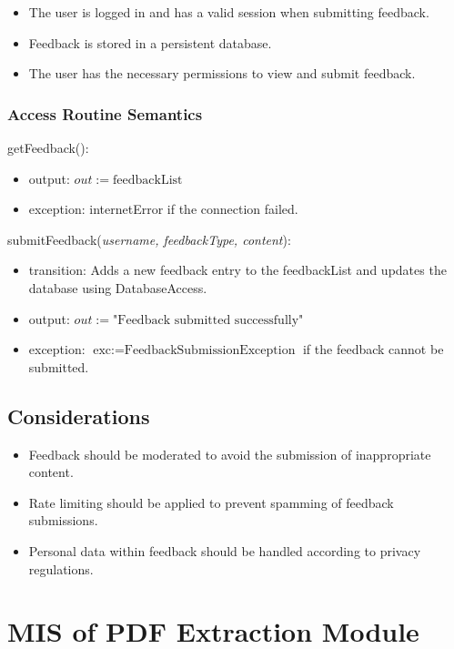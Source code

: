 \documentclass[12pt, titlepage]{article}
\begin{document}
\begin{itemize}
\begin{itemize}
  \item The user is logged in and has a valid session when submitting feedback.
  \item Feedback is stored in a persistent database.
  \item The user has the necessary permissions to view and submit feedback.
\end{itemize}

\subsubsection{Access Routine Semantics}

\noindent getFeedback():
\begin{itemize}
\item output: \( out := \text{feedbackList} \)
\item exception: internetError if the connection failed.
\end{itemize}

\noindent submitFeedback(\textit{username, feedbackType, content}):
\begin{itemize}
\item transition: Adds a new feedback entry to the feedbackList and updates the database using DatabaseAccess.
\item output: \( out := \text{"Feedback submitted successfully"} \)
\item exception: \( \text{exc} := \text{FeedbackSubmissionException} \) if the feedback cannot be submitted.
\end{itemize}

\subsection{Considerations}

\begin{itemize}
  \item Feedback should be moderated to avoid the submission of inappropriate content.
  \item Rate limiting should be applied to prevent spamming of feedback submissions.
  \item Personal data within feedback should be handled according to privacy regulations.
\end{itemize}


\newpage
\section{MIS of PDF Extraction Module} \label{PDFExtractionModule}


\end{itemize}
\end{document}
